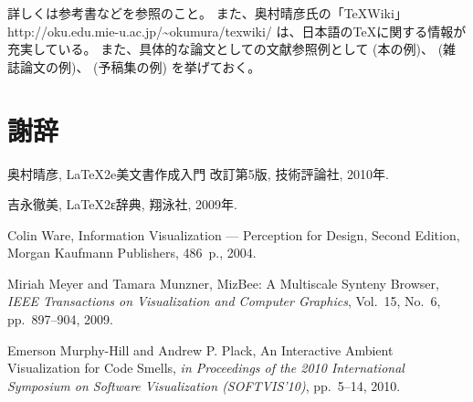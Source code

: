 \documentclass[a4paper,11pt]{jreport}
\begin{document}
詳しくは参考書\cite{okumura2010,yoshinaga2009}などを参照のこと。
また、奥村晴彦氏の「\TeX Wiki」
http://oku.edu.mie-u.ac.jp/\textasciitilde{}okumura/texwiki/
は、日本語の\TeX に関する情報が充実している。
また、具体的な論文としての文献参照例として
(本の例)\cite{ware2004}、
(雑誌論文の例)\cite{meyer2009}、
(予稿集の例)\cite{hill2010}
を挙げておく。

\chapter*{謝辞}

\newpage

\renewcommand{\bibname}{参考文献}

%
%

\begin{thebibliography}{1}
奥村晴彦, LaTeX2e美文書作成入門 改訂第5版, 技術評論社, 2010年.

吉永徹美, LaTeX2ε辞典, 翔泳社, 2009年.

Colin Ware, Information Visualization --- Perception for Design, Second Edition, Morgan Kaufmann Publishers, 486~p., 2004.

Miriah Meyer and Tamara Munzner, MizBee: A Multiscale Synteny Browser, {\em IEEE Transactions on Visualization and Computer Graphics}, Vol.~15, No.~6, pp.~897--904, 2009.

Emerson Murphy-Hill and Andrew P. Plack, An Interactive Ambient Visualization for Code Smells, {\em in Proceedings of the 2010 International Symposium on Software Visualization (SOFTVIS’10)}, pp.~5--14, 2010.

\end{thebibliography}
\end{document}
